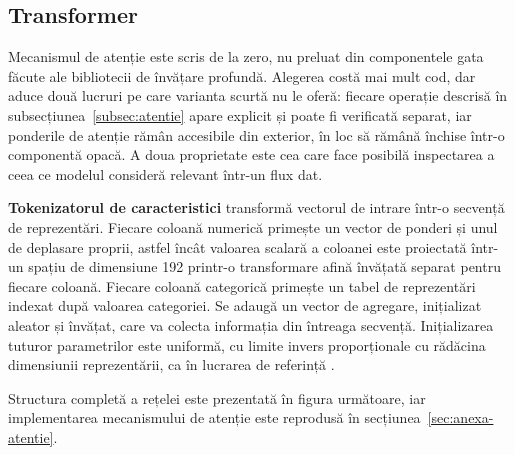 \subsection{Transformer}\label{subsec:retea}

Mecanismul de atenție este scris de la zero, nu preluat din componentele gata făcute ale bibliotecii de învățare profundă. Alegerea costă mai mult cod, dar aduce două lucruri pe care varianta scurtă nu le oferă: fiecare operație descrisă în subsecțiunea~\ref{subsec:atentie} apare explicit și poate fi verificată separat, iar ponderile de atenție rămân accesibile din exterior, în loc să rămână închise într-o componentă opacă. A doua proprietate este cea care face posibilă inspectarea a ceea ce modelul consideră relevant într-un flux dat.

\textbf{Tokenizatorul de caracteristici} transformă vectorul de intrare într-o secvență de reprezentări. Fiecare coloană numerică primește un vector de ponderi și unul de deplasare proprii, astfel încât valoarea scalară a coloanei este proiectată într-un spațiu de dimensiune 192 printr-o transformare afină învățată separat pentru fiecare coloană. Fiecare coloană categorică primește un tabel de reprezentări indexat după valoarea categoriei. Se adaugă un vector de agregare, inițializat aleator și învățat, care va colecta informația din întreaga secvență. Inițializarea tuturor parametrilor este uniformă, cu limite invers proporționale cu rădăcina dimensiunii reprezentării, ca în lucrarea de referință \cite{gorishniy2021revisiting}.

Structura completă a rețelei este prezentată în figura următoare, iar implementarea mecanismului de atenție este reprodusă în secțiunea~\ref{sec:anexa-atentie}.

